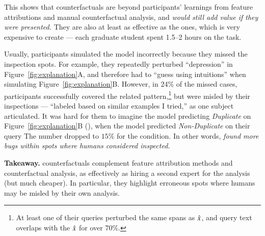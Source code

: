 This shows that \cshap counterfactuals are beyond participants' learnings from feature attributions and manual counterfactual analysis, and \emph{would still add value if they were presented.}
They are also at least as effective as the \chuman ones, which is very expensive to create --- each graduate student spent 1.5--2 hours on the task.


Usually, participants simulated the model incorrectly because they missed the inspection spots.
For example, they repeatedly perturbed ``depression'' in Figure~\ref{fig:explanation}A, and therefore had to ``guess using intuitions'' when simulating Figure~\ref{fig:explanation}B.
However, in 24\% of the missed \cshap cases, participants successfully covered the related pattern,\footnote{At least one of their queries perturbed the same spans as $\hat{x}$, and query text overlaps with the $\hat{x}$ for over 70\%.} but were misled by their inspections --- ``labeled based on similar examples I tried,'' as one subject articulated.
It was hard for them to imagine the model predicting \emph{Duplicate} on Figure~\ref{fig:explanation}B (), when the model predicted \emph{Non-Duplicate} on their query 
The number dropped to $15\%$ for the \chuman condition.
In other words, \emph{\cshap found more bugs within spots where humans considered inspected.}

\noindent\textbf{Takeaway.}
\sysname counterfactuals complement feature attribution methods and counterfactual analysis, as effectively as hiring a second expert for the analysis (but much cheaper).
In particular, they highlight erroneous spots where humans may be misled by their own analysis.
